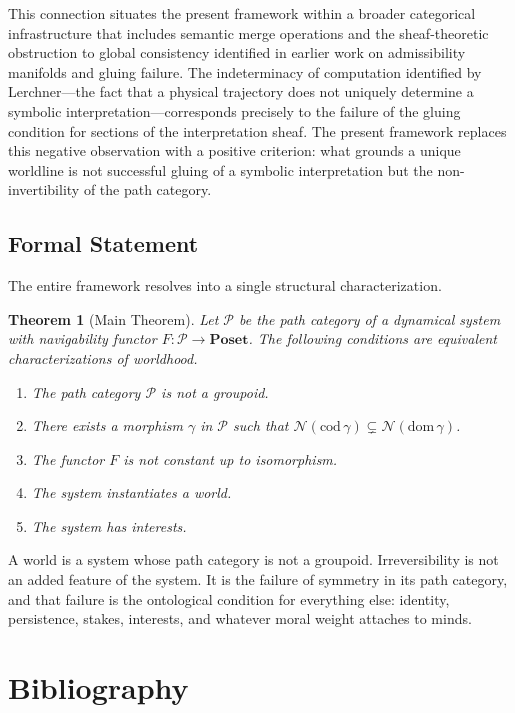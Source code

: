 \documentclass[11pt]{article}
\newtheorem{theorem}{Theorem}[section]
\theoremstyle{definition}
\theoremstyle{remark}
\begin{document}
This connection situates the present framework within a broader categorical infrastructure
that includes semantic merge operations and the sheaf-theoretic obstruction to global
consistency identified in earlier work on admissibility manifolds and gluing failure.
The indeterminacy of computation identified by Lerchner---the fact that a physical trajectory
does not uniquely determine a symbolic interpretation---corresponds precisely to the failure
of the gluing condition for sections of the interpretation sheaf. The present framework
replaces this negative observation with a positive criterion: what grounds a unique worldline
is not successful gluing of a symbolic interpretation but the non-invertibility of the
path category.

\subsection{Formal Statement}

The entire framework resolves into a single structural characterization.

\begin{theorem}[Main Theorem]
Let $\mathcal{P}$ be the path category of a dynamical system with navigability functor
$F: \mathcal{P} \to \mathbf{Poset}$. The following conditions are equivalent
characterizations of worldhood.
\begin{enumerate}
\item The path category $\mathcal{P}$ is not a groupoid.
\item There exists a morphism $\gamma$ in $\mathcal{P}$ such that $\mathcal{N}(\mathrm{cod}\,\gamma)
\subsetneq \mathcal{N}(\mathrm{dom}\,\gamma)$.
\item The functor $F$ is not constant up to isomorphism.
\item The system instantiates a world.
\item The system has interests.
\end{enumerate}
\end{theorem}

A world is a system whose path category is not a groupoid. Irreversibility is not an added
feature of the system. It is the failure of symmetry in its path category, and that failure
is the ontological condition for everything else: identity, persistence, stakes, interests,
and whatever moral weight attaches to minds.

\section{Bibliography}
\end{document}
